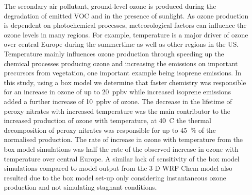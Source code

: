 The secondary air pollutant, ground-level ozone is produced during the degradation of emitted VOC and  in the presence of sunlight. 
As ozone production is dependent on photochemical processes, meteorological factors can influence the ozone levels in many regions.
For example, temperature is a major driver of ozone over central Europe during the summertime as well as other regions in the US.
Temperature mainly influences ozone production through speeding up the chemical processes producing ozone and increasing the emissions on important precursors from vegetation, one important example being isoprene emissions.
In this study, using a box model we determine that faster chemistry was responsible for an increase in ozone of up to 20~ppbv while increased isoprene emissions added a further increase of 10~ppbv of ozone.
The decrease in the lifetime of peroxy nitrates with increased temperature was the main contributor to the increased production of ozone with temperature, at $40$~\degree C the thermal decomposition of peroxy nitrates was responsible for up to $45$~\% of the normalised  production.
The rate of increase in ozone with temperature from the box model simulations was half the rate of the observed increase in ozone with temperature over central Europe.
A similar lack of sensitivity of the box model simulations compared to model output from the 3-D WRF-Chem model also resulted due to the box model set-up only considering instantaneous ozone production and not simulating stagnant conditions.
